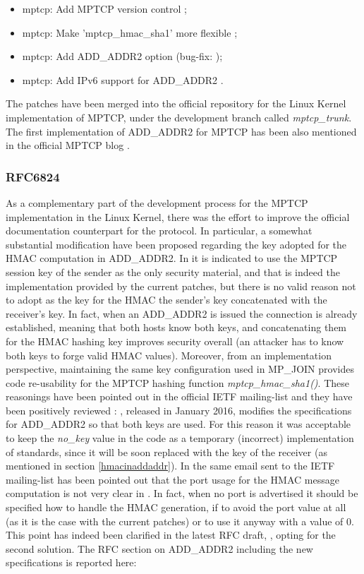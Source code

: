 \begin{itemize}
  \item mptcp: Add MPTCP version control \cite{patch1};
  \item mptcp: Make 'mptcp\_hmac\_sha1' more flexible \cite{patch2};
  \item mptcp: Add ADD\_ADDR2 option \cite{patch3} (bug-fix: \cite{patch5});
  \item mptcp: Add IPv6 support for ADD\_ADDR2 \cite{patch4}.
\end{itemize}

The patches have been merged into the official repository for the Linux Kernel implementation of MPTCP, under the development branch called \textit{mptcp\_trunk}.
The first implementation of ADD\_ADDR2 for MPTCP has been also mentioned in the official MPTCP blog \cite{blog}.

\subsubsection{RFC6824}
As a complementary part of the development process for the MPTCP implementation in the Linux Kernel, there was the effort to improve the official documentation counterpart for the protocol. In particular, a somewhat substantial modification have been proposed regarding the key adopted for the HMAC computation in ADD\_ADDR2. In  it is indicated to use the MPTCP session key of the sender as the only security material, and that is indeed the implementation provided by the current patches, but there is no valid reason not to adopt as the key for the HMAC the sender's key concatenated with the receiver's key. In fact, when an ADD\_ADDR2 is issued the connection is already established, meaning that both hosts know both keys, and concatenating them for the HMAC hashing key improves security overall (an attacker has to know both keys to forge valid HMAC values). Moreover, from an implementation perspective, maintaining the same key configuration used in MP\_JOIN provides code re-usability for the MPTCP hashing function \textit{mptcp\_hmac\_sha1()}.
These reasonings have been pointed out in the official IETF mailing-list and they have been positively reviewed \cite{maillist}: , released in January 2016, modifies the specifications for ADD\_ADDR2 so that both keys are used. For this reason it was acceptable to keep the \textit{no\_key} value in the code as a temporary (incorrect) implementation of  standards, since it will be soon replaced with the key of the receiver (as mentioned in section \ref{hmacinaddaddr}). 
In the same email sent to the IETF mailing-list has been pointed out that the port usage for the HMAC message computation is not very clear in . In fact, when no port is advertised it should be specified how to handle the HMAC generation, if to avoid the port value at all (as it is the case with the current patches) or to use it anyway with a value of 0. This point has indeed been clarified in the latest RFC draft, , opting for the second solution. The RFC section on ADD\_ADDR2 including the new specifications is reported here:

